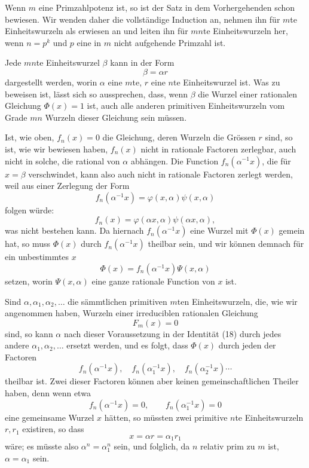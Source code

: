 \documentclass[11pt]{article}
\begin{document}
Wenn $m$ eine Primzahlpotenz ist, so ist der Satz in dem Vorhergehenden schon bewiesen. Wir wenden daher die vollständige Induction an, nehmen ihn für $m$te Einheitswurzeln als erwiesen an und leiten ihn für $mn$te Einheitswurzeln her, wenn $n=p^k$ und $p$ eine in $m$ nicht aufgehende Primzahl ist.

Jede $mn$te Einheitswurzel $\beta$ kann in der Form
\[
\beta=\alpha r
\]
dargestellt werden, worin $\alpha$ eine $m$te, $r$ eine $n$te Einheitswurzel ist. Was zu beweisen ist, lässt sich so aussprechen, dass, wenn $\beta$ die Wurzel einer rationalen Gleichung $\Phi(x)=1$ ist, auch alle anderen primitiven Einheitswurzeln vom Grade $mn$ Wurzeln dieser Gleichung sein müssen.

Ist, wie oben, $f_n(x)=0$ die Gleichung, deren Wurzeln die Grössen $r$ sind, so ist, wie wir bewiesen haben, $f_n(x)$ nicht in rationale Factoren zerlegbar, auch nicht in solche, die rational von $\alpha$ abhängen. Die Function $f_n(\alpha^{-1}x)$, die für $x=\beta$ verschwindet, kann also auch nicht in rationale Factoren zerlegt werden, weil aus einer Zerlegung der Form
\[
f_n(\alpha^{-1}x)=\varphi(x,\alpha)\psi(x,\alpha)
\]
folgen würde:
\[
f_n(x)=\varphi(\alpha x,\alpha)\psi(\alpha x,\alpha),
\]
was nicht bestehen kann. Da hiernach $f_n(\alpha^{-1}x)$ eine Wurzel
mit $\Phi(x)$ gemein hat, so muss $\Phi(x)$ durch $f_n(\alpha^{-1}x)$ theilbar sein, und wir können demnach für ein unbestimmtes $x$
\begin{equation}\tag{18}
\Phi(x)=f_n(\alpha^{-1}x)\Psi(x,\alpha)
\end{equation}
setzen, worin $\Psi(x,\alpha)$ eine ganze rationale Function von $x$ ist.

Sind $\alpha,\alpha_1,\alpha_2,\ldots$ die sämmtlichen primitiven $m$ten Einheitswurzeln, die, wie wir angenommen haben, Wurzeln einer irreduciblen rationalen Gleichung
\[
F_m(x)=0
\]
sind, so kann $\alpha$ nach dieser Voraussetzung in der Identität (18) durch jedes andere $\alpha_1,\alpha_2,\ldots$ ersetzt werden, und es folgt, dass $\Phi(x)$ durch jeden der Factoren
\[
f_n(\alpha^{-1}x),\quad f_n(\alpha_1^{-1}x),\quad f_n(\alpha_2^{-1}x)\cdots
\]
theilbar ist. Zwei dieser Factoren können aber keinen gemeinschaftlichen Theiler haben, denn wenn etwa
\[
f_n(\alpha^{-1}x)=0,
\qquad
f_n(\alpha_1^{-1}x)=0
\]
eine gemeinsame Wurzel $x$ hätten, so müssten zwei primitive $n$te Einheitswurzeln $r,r_1$ existiren, so dass
\[
x=\alpha r=\alpha_1r_1
\]
wäre; es müsste also $\alpha^n=\alpha_1^n$ sein, und folglich, da $n$ relativ prim zu $m$ ist, $\alpha=\alpha_1$ sein.
\end{document}
